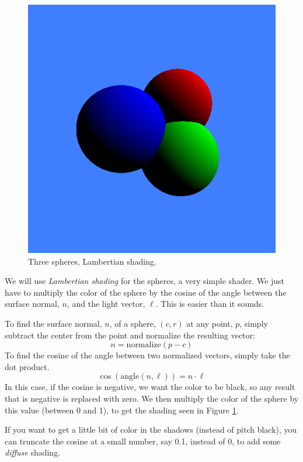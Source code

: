 \documentclass{article}
\begin{document}
\begin{description}
\begin{description}
\begin{figure}
  \centerline{\includegraphics[scale=0.5]{threelambertianspheres.png}}
  \caption{Three spheres, Lambertian shading.}
  \label{sphereslambertian}
\end{figure}

We will use {\em Lambertian shading}
for the spheres, a very simple shader.
We just have to multiply the
color of the sphere by the cosine of the angle between the surface
normal, $n$, and the light vector, $\ell$.  This is easier than it sounds.

To find the surface normal, $n$, of a sphere, $(c,r)$ at any point, $p$,
simply subtract the center from the point and normalize the
resulting vector:
\[
n = \mbox{normalize}(p-c)
\]
To find the cosine of the angle between two normalized vectors, simply
take the dot product.
\[
\cos(\mbox{angle}(n,\ell)) = n \cdot \ell
\]
In this case, if the cosine is negative, we want the color to be
black, so any result that is negative is replaced with zero.
We then multiply the color of the sphere by this value (between 0 and
1), to get the shading seen in Figure \ref{sphereslambertian}.

If you want to get a little bit of color in the shadows (instead of
pitch black), you can truncate the cosine at a small number, say 0.1,
instead of 0, to add some {\em diffuse} shading.


\end{description}
\end{description}
\end{document}
